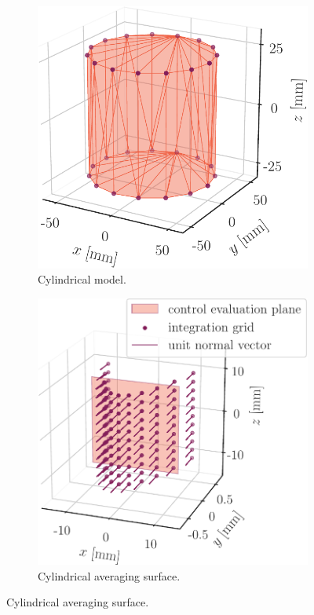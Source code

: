 \begin{figure}[ht]
    \centering
    \begin{subfigure}[b]{0.42\textwidth}
        \centering
        \includegraphics[width=\linewidth]{artwork/cylindrical_model.pdf}
        \caption{Cylindrical model.}
        \label{fig:cylindrical_model}
    \end{subfigure}
    \hfil
    \begin{subfigure}[b]{0.47\textwidth}
        \centering
        \includegraphics[width=\linewidth]{artwork/cylindrical_surface.pdf}
        \caption{Cylindrical averaging surface.}
        \label{fig:cylindrical_surface}
        \end{subfigure}
    

\end{figure}
